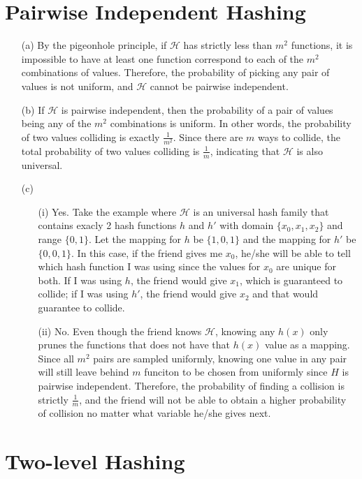 \documentclass[11pt]{article}
\theoremstyle{definition}
\theoremstyle{remark}
\begin{document}
\section{Pairwise Independent Hashing}
\begin{enumerate}
\item[(a)] By the pigeonhole principle, if $\mathcal{H}$ has strictly less than $m^2$ functions, it is impossible to have at least one function correspond to each of the $m^2$ combinations of values. Therefore, the probability of picking any pair of values is not uniform, and $\mathcal{H}$ cannot be pairwise independent.

\item[(b)] If $\mathcal{H}$ is pairwise independent, then the probability of a pair of values being any of the $m^2$ combinations is uniform. In other words, the probability of two values colliding is exactly $\frac{1}{m^2}$. Since there are $m$ ways to collide, the total probability of two values colliding is $\frac{1}{m}$, indicating that $\mathcal{H}$ is also universal.

\item[(c)]
\begin{enumerate}
\item[(i)]
Yes. Take the example where $\mathcal{H}$ is an universal hash family that contains exacly 2 hash functions $h$ and $h'$ with domain $\{x_0, x_1, x_2\}$ and range $\{0,1\}$. Let the mapping for $h$ be $\{1,0,1\}$ and the mapping for $h'$ be $\{0,0,1\}$. In this case, if the friend gives me $x_0$, he/she will be able to tell which hash function I was using since the values for $x_0$ are unique for both. If I was using $h$, the friend would give $x_1$, which is guaranteed to collide; if I was using $h'$, the friend would give $x_2$ and that would guarantee to collide.

\item[(ii)]
No. Even though the friend knows $\mathcal{H}$, knowing any $h(x)$ only prunes the functions that does not have that $h(x)$ value as a mapping. Since all $m^2$ pairs are sampled uniformly, knowing one value in any pair will still leave behind $m$ funciton to be chosen from uniformly since $H$ is pairwise independent. Therefore, the probability of finding a collision is strictly $\frac{1}{m}$, and the friend will not be able to obtain a higher probability of collision no matter what variable he/she gives next.
\end{enumerate}
\end{enumerate}
\clearpage

\section{Two-level Hashing}
\end{document}
